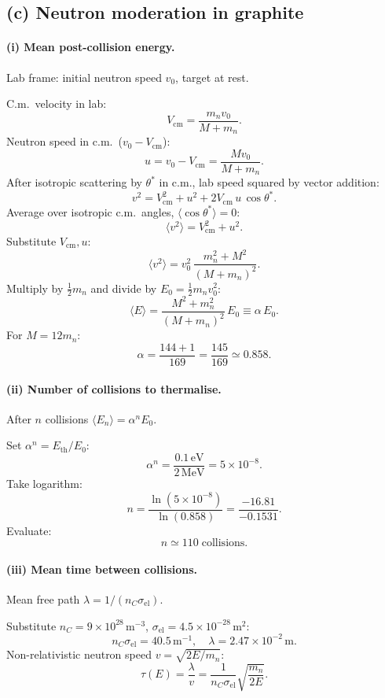 \documentclass[11pt]{article}
\begin{document}
\subsection*{(c) Neutron moderation in graphite}

\paragraph{(i) Mean post-collision energy.} Lab frame: initial neutron speed $v_0$, target at rest.

C.m.\ velocity in lab:
\[
V_\mathrm{cm}=\frac{m_n v_0}{M+m_n}.
\]
Neutron speed in c.m.\ ($v_0-V_\mathrm{cm}$):
\[
u=v_0-V_\mathrm{cm}=\frac{M v_0}{M+m_n}.
\]
After isotropic scattering by $\theta^*$ in c.m., lab speed squared by vector addition:
\[
v^2 = V_\mathrm{cm}^2 + u^2 + 2 V_\mathrm{cm}\,u\,\cos\theta^*.
\]
Average over isotropic c.m.\ angles, $\langle\cos\theta^*\rangle=0$:
\[
\langle v^2\rangle = V_\mathrm{cm}^2 + u^2.
\]
Substitute $V_\mathrm{cm}, u$:
\[
\langle v^2\rangle = v_0^2\,\frac{m_n^2 + M^2}{(M+m_n)^2}.
\]
Multiply by $\tfrac12 m_n$ and divide by $E_0=\tfrac12 m_n v_0^2$:
\[
\boxed{\;\langle E\rangle = \frac{M^2+m_n^2}{(M+m_n)^2}\,E_0 \equiv \alpha\,E_0.\;}
\]
For $M=12 m_n$:
\[
\alpha = \frac{144+1}{169}=\frac{145}{169}\simeq 0.858.
\]

\paragraph{(ii) Number of collisions to thermalise.} After $n$ collisions $\langle E_n\rangle=\alpha^n E_0$.

Set $\alpha^n=E_\mathrm{th}/E_0$:
\[
\alpha^n=\frac{0.1\,\mathrm{eV}}{2\,\mathrm{MeV}}=5\times 10^{-8}.
\]
Take logarithm:
\[
n=\frac{\ln(5\times 10^{-8})}{\ln(0.858)}=\frac{-16.81}{-0.1531}.
\]
Evaluate:
\[
\boxed{\;n\simeq 110\;\text{collisions.}\;}
\]

\paragraph{(iii) Mean time between collisions.} Mean free path $\lambda=1/(n_C\sigma_\mathrm{el})$.

Substitute $n_C=9\times 10^{28}$\,m$^{-3}$, $\sigma_\mathrm{el}=4.5\times 10^{-28}$\,m$^2$:
\[
n_C\sigma_\mathrm{el}=40.5\,\mathrm{m^{-1}},\quad \lambda=2.47\times 10^{-2}\,\mathrm{m}.
\]
Non-relativistic neutron speed $v=\sqrt{2E/m_n}$:
\[
\boxed{\;\tau(E)=\frac{\lambda}{v}=\frac{1}{n_C\sigma_\mathrm{el}}\sqrt{\frac{m_n}{2E}}.\;}
\]
\end{document}
